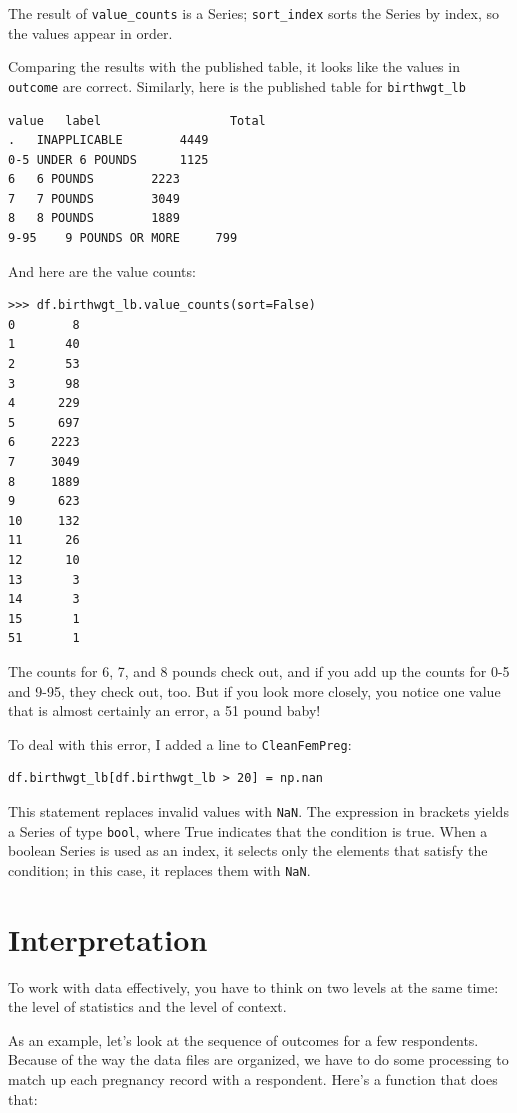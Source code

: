 \documentclass[12pt]{book}
\begin{document}
The result of \verb"value_counts" is a Series;
\verb"sort_index" sorts the Series by index, so the
values appear in order.

Comparing the results with the published table, it looks like the
values in {\tt outcome} are correct.  Similarly, here is the published
table for \verb"birthwgt_lb"

\begin{verbatim}
value	label                  Total
.	INAPPLICABLE	 	4449
0-5	UNDER 6 POUNDS	 	1125
6	6 POUNDS	 	2223
7	7 POUNDS	 	3049
8	8 POUNDS	 	1889
9-95	9 POUNDS OR MORE	 799
\end{verbatim}

And here are the value counts:

\begin{verbatim}
>>> df.birthwgt_lb.value_counts(sort=False)
0        8
1       40
2       53
3       98
4      229
5      697
6     2223
7     3049
8     1889
9      623
10     132
11      26
12      10
13       3
14       3
15       1
51       1
\end{verbatim}

The counts for 6, 7, and 8 pounds check out, and if you add
up the counts for 0-5 and 9-95, they check out, too.  But
if you look more closely, you notice one value that is almost
certainly an error, a 51 pound baby!

To deal with this error, I added a line to {\tt CleanFemPreg}:

\begin{verbatim}
df.birthwgt_lb[df.birthwgt_lb > 20] = np.nan
\end{verbatim}

This statement replaces invalid values with {\tt NaN}.
The expression in brackets yields a Series of type {\tt bool}, 
where True indicates that the condition is true.  When a boolean
Series is used as an index, it selects only the elements that
satisfy the condition; in this case, it replaces them with {\tt NaN}.


\section{Interpretation}

To work with data effectively, you have to think on two levels at the
same time: the level of statistics and the level of context.

As an example, let's look at the sequence of outcomes for a few
respondents.  Because of the way the data files are organized, we have
to do some processing to match up each pregnancy record with a respondent.
Here's a function that does that:
\end{document}
